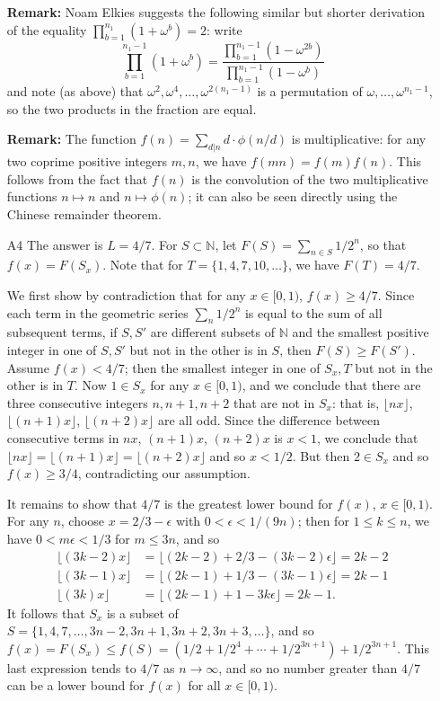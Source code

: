 \documentclass[amssymb,twocolumn,pra,10pt,aps]{revtex4-1}
\begin{document}
\begin{itemize}
\noindent
\textbf{Remark:}
Noam Elkies suggests the following similar but shorter derivation of the equality
$\prod_{b=1}^{n_1} (1 + \omega^b) = 2$: write
\[
\prod_{b=1}^{n_1-1} (1 + \omega^b) = \frac{\prod_{b=1}^{n_1 - 1} (1 - \omega^{2b})}{\prod_{b=1}^{n_1-1} (1 - \omega^b)}
\]
and note (as above) that $\omega^2, \omega^{4}, \dots, \omega^{2(n_1-1)}$ is a permutation of $\omega, \dots, \omega^{n_1-1}$, so the two products in the fraction are equal.

\noindent
\textbf{Remark:}
The function $f(n) = \sum_{d|n} d\cdot \phi(n/d)$ is multiplicative: for any two coprime positive integers $m,n$, we have $f(mn) = f(m) f(n)$. This follows from the fact that $f(n)$ is the convolution of the two multiplicative functions $n \mapsto n$ and $n \mapsto \phi(n)$; it can also be seen directly using the Chinese remainder theorem.

\item[A4]
The answer is $L = 4/7$. For $S \subset \mathbb{N}$, let $F(S) = \sum_{n\in S} 1/2^n$, so that $f(x) = F(S_x)$. Note that for $T = \{1,4,7,10,\ldots\}$, we have $F(T) = 4/7$.

We first show by contradiction that for any $x \in [0,1)$, $f(x) \geq 4/7$.
Since each term in the geometric series $\sum_n 1/2^n$ is equal to the sum of all subsequent terms, if $S,S'$ are different subsets of $\mathbb{N}$ and the smallest positive integer in one of $S,S'$ but not in the other is in $S$, then $F(S) \geq F(S')$. Assume $f(x) < 4/7$; then the smallest integer in one of $S_x,T$ but not in the other is in $T$. Now $1 \in S_x$ for any $x \in [0,1)$, and we conclude that there are three consecutive integers $n,n+1,n+2$ that are not in $S_x$: that is, $\lfloor nx\rfloor$, $\lfloor (n+1)x\rfloor$, $\lfloor (n+2)x\rfloor$ are all odd. Since the difference between consecutive terms in $nx$, $(n+1)x$, $(n+2)x$ is $x<1$, we conclude that $\lfloor nx\rfloor = \lfloor (n+1)x\rfloor = \lfloor (n+2)x\rfloor$ and so $x<1/2$. But then $2\in S_x$ and so $f(x) \geq 3/4$, contradicting our assumption.

It remains to show that $4/7$ is the greatest lower bound for $f(x)$, $x\in [0,1)$.
For any $n$, choose $x = 2/3-\epsilon$ with $0<\epsilon<1/(9n)$; then for $1\leq k\leq n$, we have $0<m\epsilon<1/3$ for $m \leq 3n$, and so
\begin{align*}
\lfloor (3k-2)x \rfloor &= \lfloor (2k-2)+2/3-(3k-2)\epsilon \rfloor = 2k-2 \\
\lfloor (3k-1)x \rfloor &= \lfloor (2k-1)+1/3-(3k-1)\epsilon \rfloor = 2k-1 \\
\lfloor (3k)x \rfloor &= \lfloor (2k-1)+1-3k\epsilon \rfloor = 2k-1.
\end{align*}
It follows that $S_x$ is a subset of $S = \{1,4,7,\ldots,3n-2,3n+1,3n+2,3n+3,\ldots\}$, and so
$f(x) = F(S_x) \leq f(S) = (1/2+1/2^4+\cdots+1/2^{3n+1})+1/2^{3n+1}$. This last expression tends to $4/7$ as $n\to\infty$, and so no number greater than $4/7$ can be a lower bound for $f(x)$ for all $x\in [0,1)$.


\end{itemize}
\end{document}
